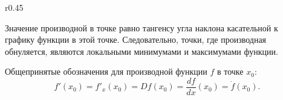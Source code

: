 \begin{wrapfigure}[10]{r}{0.45\tw}
    \caption{}
    \label{pic:math-div}
\end{wrapfigure}
Значение производной в точке равно тангенсу угла наклона касательной к графику функции в этой точке. Следовательно, точки, где производная обнуляется, являются локальными минимумами и максимумами функции.

Общепринятые обозначения для производной функции $f$ в точке $x_0$:
\begin{equation}
    f'(x_0) = f'_x(x_0) = D f(x_0) = \frac{d f}{d x}(x_0) = \dot{f} (x_0).
\end{equation}

